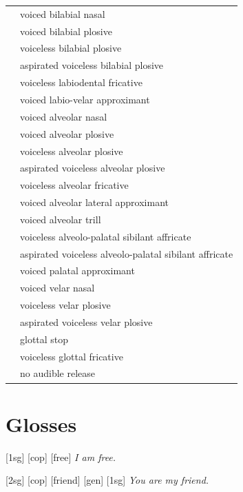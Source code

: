 \documentclass{article}
\begin{document}
\begin{xltabular}{\textwidth}{lL}
   & voiced bilabial nasal \\
   & voiced bilabial plosive \\
   & voiceless bilabial plosive \\
   & aspirated voiceless bilabial plosive \\
   & voiceless labiodental fricative \\
   & voiced labio-velar approximant \\
   & voiced alveolar nasal \\
   & voiced alveolar plosive \\
   & voiceless alveolar plosive \\
   & aspirated voiceless alveolar plosive \\
   & voiceless alveolar fricative \\
   & voiced alveolar lateral approximant \\
   & voiced alveolar trill \\
  \ipa{\texttctclig} & voiceless alveolo-palatal sibilant affricate \\
   & aspirated voiceless alveolo-palatal sibilant affricate\\
   & voiced palatal approximant \\
   & voiced velar nasal \\
   & voiceless velar plosive \\
   & aspirated voiceless velar plosive \\
   & glottal stop \\
   & voiceless glottal fricative \\
  \ipa{\textcorner} & no audible release \\
\end{xltabular}

\newpage\section{Glosses}

\ex[lingstyle=custom_nlevel]
\begingl
{}[{\sc 1sg}]
[{\sc cop}]
[free]
\glft \textit{I am free.}
\endgl
\xe

\ex[lingstyle=custom_nlevel]
\begingl
{}[{\sc 2sg}]
[{\sc cop}]
[friend]
[{\sc gen}]
[{\sc 1sg}]
\glft \textit{You are my friend.}
\endgl
\xe
\end{document}
